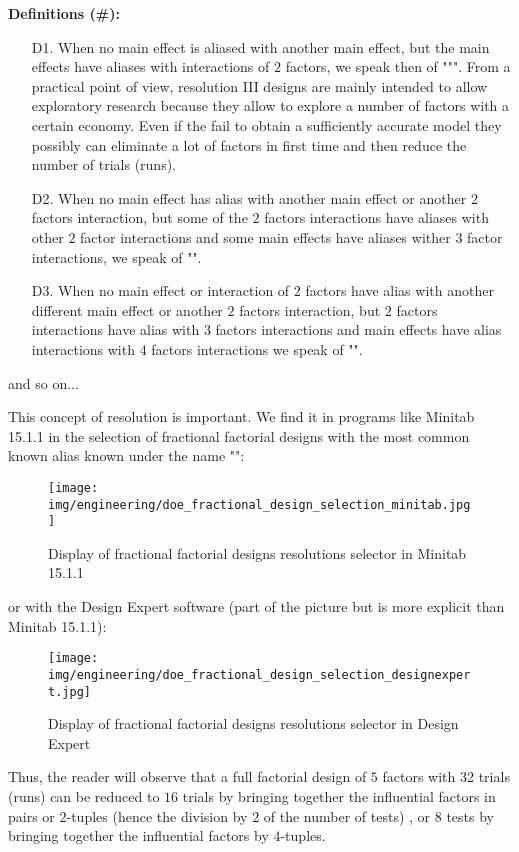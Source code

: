 	\textbf{Definitions (\#\mydef):}
	\begin{enumerate}
		\item[D1.] When no main effect is aliased with another main effect, but the main effects have aliases with interactions of $2$ factors, we speak then of """. From a practical point of view, resolution III designs are mainly intended to allow exploratory research because they allow to explore a number of factors with a certain economy. Even if the fail to obtain a sufficiently accurate model they possibly can eliminate a lot of factors in first time and then reduce the number of trials (runs).

		\item[D2.] When no main effect has alias with another main effect or another $2$ factors interaction, but some of the $2$ factors interactions have aliases with other $2$ factor interactions  and some main effects have aliases wither $3$ factor interactions, we speak of "".

		\item[D3.] When no main effect or interaction of $2$ factors have alias with another different main effect or another $2$ factors interaction, but $2$ factors interactions have alias with $3$ factors interactions and main effects have alias interactions with $4$ factors interactions we speak of "".
	\end{enumerate}
	and so on...
	
	This concept of resolution is important. We find it in programs like Minitab 15.1.1 in the selection of fractional factorial designs with the most common known alias known under the name "":
	\begin{figure}[H]
		\begin{center}
		\texttt{[image: img/engineering/doe\_fractional\_design\_selection\_minitab.jpg]}
		\end{center}	
		\caption{Display of fractional factorial designs resolutions selector in Minitab 15.1.1}
	\end{figure}
	or with the Design Expert software (part of the picture but is more explicit than Minitab 15.1.1):
	\begin{figure}[H]
		\begin{center}
		\texttt{[image: img/engineering/doe\_fractional\_design\_selection\_designexpert.jpg]}
		\end{center}	
		\caption{Display of fractional factorial designs resolutions selector in Design Expert}
	\end{figure}
	Thus, the reader will observe that a full factorial design of $5$ factors with 32 trials (runs) can be reduced to $16$ trials by bringing together the influential factors in pairs or $2$-tuples (hence the division by $2$ of the number of tests) , or $8$ tests by bringing together the influential factors by $4$-tuples.
	
